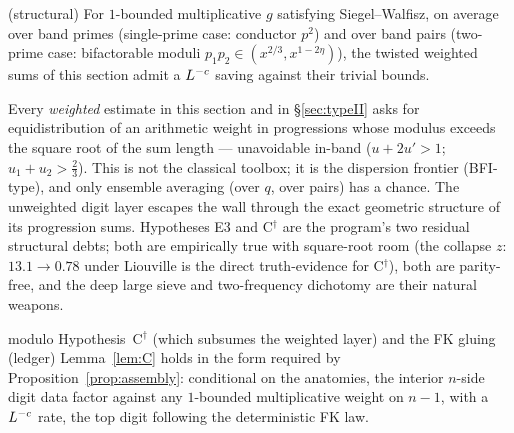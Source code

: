 \begin{hypothesis}
\label{hyp:Cdagger}
\statusO{} (structural)\quad
For $1$-bounded multiplicative $g$ satisfying Siegel--Walfisz, on
average over band primes (single-prime case: conductor $p^{2}$) and
over band pairs (two-prime case: bifactorable moduli
$p_1p_2\in(x^{2/3},x^{1-2\eta})$), the twisted weighted sums of this
section admit a $L^{-c}$ saving against their trivial bounds.
\end{hypothesis}

\begin{remark}
Every \emph{weighted} estimate in this section and in
\S\ref{sec:typeII} asks for equidistribution of an arithmetic weight
in progressions whose modulus exceeds the square root of the sum
length --- unavoidable in-band ($u+2u'>1$; $u_1+u_2>\tfrac23$). This
is not the classical toolbox; it is the dispersion frontier
(BFI-type), and only ensemble averaging (over $q$, over pairs) has a
chance. The unweighted digit layer escapes the wall through the exact
geometric structure of its progression sums. Hypotheses E3 and
C$^\dagger$ are the program's two residual structural debts; both are
empirically true with square-root room (the collapse $z$:
$13.1\to0.78$ under Liouville is the direct truth-evidence for
C$^\dagger$), both are parity-free, and the deep large sieve and
two-frequency dichotomy are their natural weapons.
\end{remark}

\begin{proposition}\label{prop:C-assembled}
\statusO{} modulo Hypothesis~C$^\dagger$ (which subsumes the weighted
layer) and the FK gluing (ledger)\quad
Lemma~\ref{lem:C} holds in the form required by
Proposition~\ref{prop:assembly}: conditional on the anatomies, the
interior $n$-side digit data factor against any $1$-bounded
multiplicative weight on $n-1$, with a $L^{-c}$ rate, the top
digit following the deterministic FK law.
\end{proposition}
